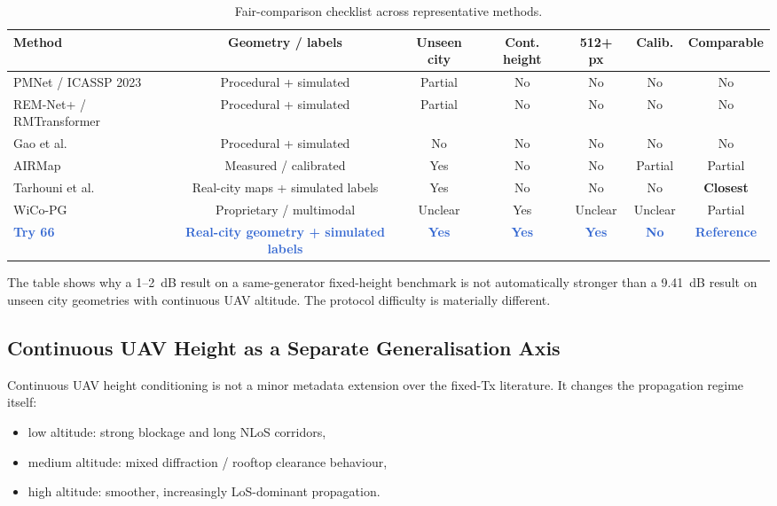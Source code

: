 \documentclass[11pt,a4paper]{article}
\newcommand{\better}[1]{\textcolor{good}{\textbf{#1}}}
\newcommand{\ours}[1]{\textcolor{highlight}{\textbf{#1}}}
\begin{document}
\begin{table}[h!]
\centering
\caption{Fair-comparison checklist across representative methods.}
\label{tab:fairness}
\small
\begin{tabularx}{\textwidth}{Xcccccc}
\toprule
\textbf{Method} & \textbf{Geometry / labels} & \textbf{Unseen city} & \textbf{Cont. height}
& \textbf{512+ px} & \textbf{Calib.} & \textbf{Comparable} \\
\midrule
PMNet / ICASSP 2023 & Procedural + simulated & Partial & No & No & No & No \\
REM-Net+ / RMTransformer & Procedural + simulated & Partial & No & No & No & No \\
Gao et al. & Procedural + simulated & No & No & No & No & No \\
AIRMap & Measured / calibrated & Yes & No & No & Partial & Partial \\
Tarhouni et al. & Real-city maps + simulated labels & Yes & No & No & No & \better{Closest} \\
WiCo-PG & Proprietary / multimodal & Unclear & Yes & Unclear & Unclear & Partial \\
\ours{Try 66} & \ours{Real-city geometry + simulated labels} & \ours{Yes} & \ours{Yes} & \ours{Yes} & \ours{No} & \ours{Reference} \\
\bottomrule
\end{tabularx}
\end{table}

The table shows why a 1--2~dB result on a same-generator fixed-height benchmark
is not automatically stronger than a 9.41~dB result on unseen city geometries with
continuous UAV altitude. The protocol difficulty is materially different.

\subsection{Continuous UAV Height as a Separate Generalisation Axis}

Continuous UAV height conditioning is not a minor metadata extension over the
fixed-Tx literature. It changes the propagation regime itself:
\begin{itemize}[nosep]
    \item low altitude: strong blockage and long NLoS corridors,
    \item medium altitude: mixed diffraction / rooftop clearance behaviour,
    \item high altitude: smoother, increasingly LoS-dominant propagation.
\end{itemize}
\end{document}
